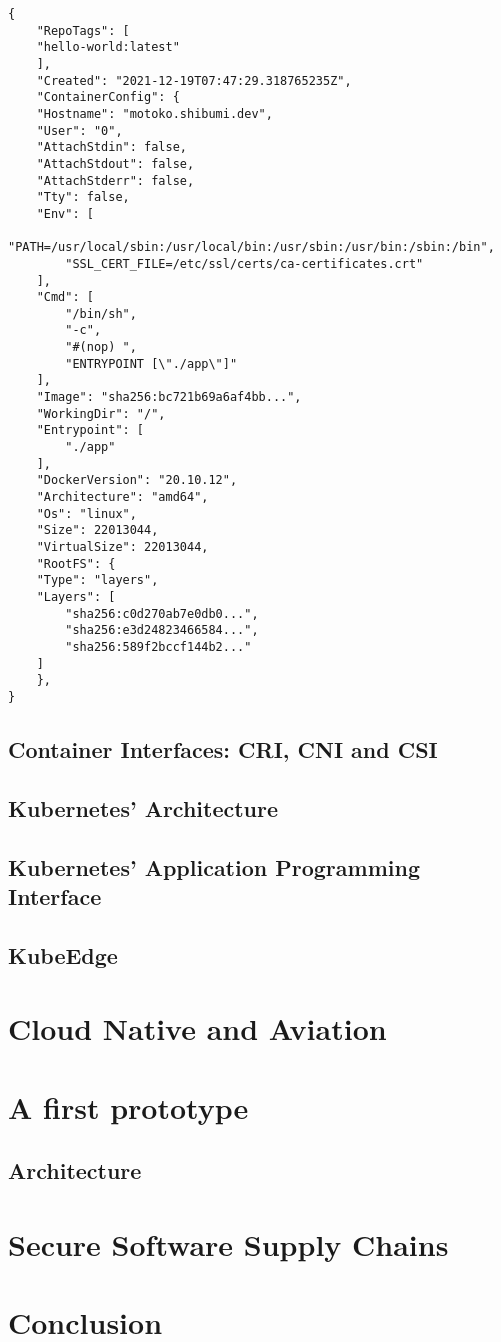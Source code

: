 \documentclass[titlepage]{report}
\begin{document}
\begin{minipage}{\linewidth}
\begin{lstlisting}[caption={An OCI image configuration created via docker image inspect (shortened)},label={lst:imageConfiguration}]
{
    "RepoTags": [
    "hello-world:latest"
    ],
    "Created": "2021-12-19T07:47:29.318765235Z",
    "ContainerConfig": {
    "Hostname": "motoko.shibumi.dev",
    "User": "0",
    "AttachStdin": false,
    "AttachStdout": false,
    "AttachStderr": false,
    "Tty": false,
    "Env": [
        "PATH=/usr/local/sbin:/usr/local/bin:/usr/sbin:/usr/bin:/sbin:/bin",
        "SSL_CERT_FILE=/etc/ssl/certs/ca-certificates.crt"
    ],
    "Cmd": [
        "/bin/sh",
        "-c",
        "#(nop) ",
        "ENTRYPOINT [\"./app\"]"
    ],
    "Image": "sha256:bc721b69a6af4bb...",
    "WorkingDir": "/",
    "Entrypoint": [
        "./app"
    ],
    "DockerVersion": "20.10.12",
    "Architecture": "amd64",
    "Os": "linux",
    "Size": 22013044,
    "VirtualSize": 22013044,
    "RootFS": {
    "Type": "layers",
    "Layers": [
        "sha256:c0d270ab7e0db0...",
        "sha256:e3d24823466584...",
        "sha256:589f2bccf144b2..."
    ]
    },
}
\end{lstlisting}
\end{minipage}


\section{Container Interfaces: CRI, CNI and CSI}
\section{Kubernetes' Architecture}
\section{Kubernetes' Application Programming Interface}
\section{KubeEdge}
\chapter{Cloud Native and Aviation}
\chapter{A first prototype}
\section{Architecture}
\chapter{Secure Software Supply Chains}
\chapter{Conclusion}

\nocite{*}
\printbibliography{}
\lstlistoflistings{}
\listoftables{}
\listoffigures
\glsaddallunused
\printglossary{}
\end{document}
